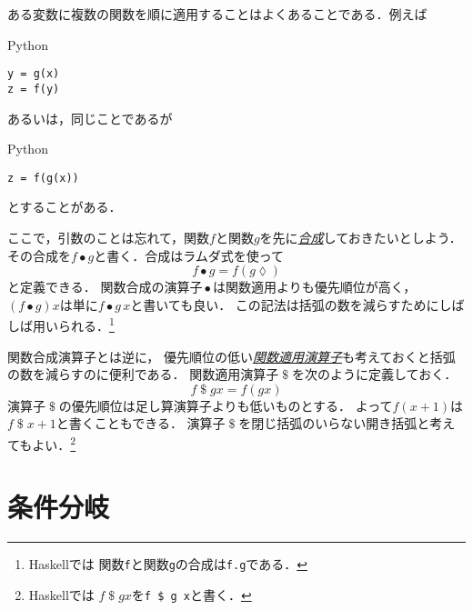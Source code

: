 \documentclass[a5paper,draft]{jsbook}
\newcommand{\programminglanguage}[1]{\textsf{#1}}
\newcommand{\haskell}{\programminglanguage{Haskell}}
\newcommand{\python}{\programminglanguage{Python}}
\newcommand{\keyword}[1]{{\underline{\emph{#1}}}}
\newcommand{\code}[1]{\texttt{#1}}
\newenvironment{pythoncode}{\begin{itembox}[r]{\python}}{\end{itembox}}
\newcommand{\mathAnonymousParameter}{\lozenge}
\newcommand{\mathBinaryOperator}[1]{\operatorname{#1}}
\newcommand{\mathApply}{\mathBinaryOperator{\$}}
\newcommand{\mathCompose}{\mathBinaryOperator{\bullet}}
\begin{document}
ある変数に複数の関数を順に適用することはよくあることである．例えば
\begin{pythoncode}
\begin{verbatim}
y = g(x)
z = f(y)
\end{verbatim}
\end{pythoncode}
あるいは，同じことであるが
\begin{pythoncode}
\begin{verbatim}
z = f(g(x))
\end{verbatim}
\end{pythoncode}
とすることがある．

ここで，引数のことは忘れて，関数$f$と関数$g$を先に\keyword{合成}しておきたいとしよう．
その合成を$f\mathCompose g$と書く．合成はラムダ式を使って
\begin{equation}
f\mathCompose g=f\left(g\mathAnonymousParameter\right)
\end{equation}
と定義できる．
関数合成の演算子$\mathCompose$は関数適用よりも優先順位が高く，
$\left(f\mathCompose g\right)x$は単に$f\mathCompose g\,x$と書いても良い．
この記法は括弧の数を減らすためにしばしば用いられる．\footnote{\haskell では
関数\code{f}と関数\code{g}の合成は\code{f.g}である．}

関数合成演算子とは逆に，
優先順位の低い\keyword{関数適用演算子}も考えておくと括弧の数を減らすのに便利である．
関数適用演算子$\mathApply$を次のように定義しておく．
\begin{equation}
f\mathApply gx=f\left(gx\right)
\end{equation}
演算子$\mathApply$の優先順位は足し算演算子よりも低いものとする．
よって$f(x+1)$は$f\mathApply x+1$と書くこともできる．
演算子$\mathApply$を閉じ括弧のいらない開き括弧と考えてもよい．\footnote{\haskell では
$f\mathApply gx$を\code{f \$ g x}と書く．}

\section{条件分岐}
\label{sec:if}
\end{document}
